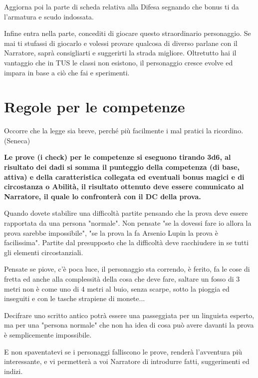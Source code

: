 \documentclass[a4paper,11pt,twoside,openany]{book}
\begin{document}
Aggiorna poi la parte di scheda relativa alla Difesa segnando che bonus ti da l'armatura e scudo indossata.

Infine entra nella parte, concediti di giocare questo straordinario personaggio. Se mai ti stufassi di giocarlo e volessi provare qualcosa di diverso parlane con il Narratore, saprà consigliarti e suggerirti la strada migliore.
Oltretutto hai il vantaggio che in TUS le classi non esistono, il personaggio cresce evolve ed impara in base a ciò che fai e sperimenti.

\pagebreak

\section{Regole per le competenze}

\label{regole-per-le-competenze}
\begin{tcolorbox}[enhanced,arc=5pt,boxrule=0.3pt]{
		Occorre che la legge sia breve, perché più facilmente i mal pratici la ricordino. (Seneca)
	}\end{tcolorbox}\medskip

\textbf{Le prove (i check) per le competenze si eseguono tirando 3d6, al risultato dei dadi si somma il punteggio della competenza (di base, attiva) e della caratteristica collegata ed eventuali bonus magici e di circostanza o Abilità, il risultato ottenuto deve essere comunicato al Narratore, il quale lo confronterà con il DC della prova.}

Quando dovete stabilire una difficoltà partite pensando che la prova deve essere rapportata da una persona "normale". Non pensate "se la dovessi fare io allora la prova sarebbe impossibile", "se la prova la fa Arsenio Lupin la prova è facilissima". Partite dal presupposto che la difficoltà deve racchiudere in se tutti gli elementi circostanziali.

Pensate se piove, c'è poca luce, il personaggio sta correndo, è ferito, fa le cose di fretta ed anche alla complessità della cosa che deve fare, saltare un fosso di 3 metri non è come uno di 4 metri al buio, senza scarpe, sotto la pioggia ed inseguiti e con le tasche strapiene di monete...

Decifrare uno scritto antico potrà essere una passeggiata per un linguista esperto, ma per una "persona normale" che non ha idea di cosa può avere davanti la prova è semplicemente impossibile.

E non spaventatevi se i personaggi falliscono le prove, renderà l'avventura più interessante, e vi permetterà a voi Narratore di introdurre fatti, suggerimenti ed indizi.
\end{document}
